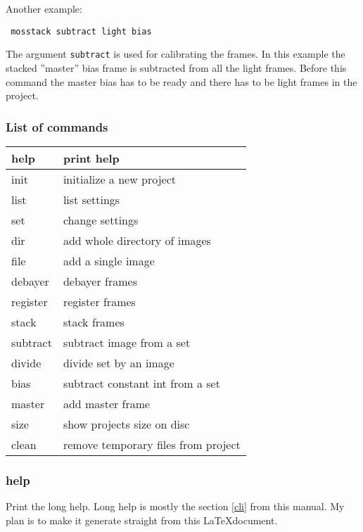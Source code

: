 \documentclass[twoside,a4paper]{refart}
\begin{document}
Another example:

\begin{verbatim}
 mosstack subtract light bias
\end{verbatim}

The argument \texttt{subtract} is used for calibrating the frames. In this example the stacked ''master'' bias frame is
subtracted from all the light frames. Before this command the master bias has to be ready and there has to be light frames
in the project.


\subsubsection{List of commands}
\label{list of commands}

\begin{tabular}{|l|l|}
\hline
help        & print help \\ \hline
init        & initialize a new project \\ \hline
list        & list settings \\ \hline
set         & change settings \\ \hline
dir         & add whole directory of images\\ \hline
file        & add a single image\\ \hline
debayer     & debayer frames\\ \hline
register    & register frames\\ \hline
stack       & stack frames\\ \hline
subtract    & subtract image from a set\\ \hline
divide      & divide set by an image\\ \hline
bias        & subtract constant int from a set \\ \hline
master      & add master frame \\ \hline
size        & show projects size on disc \\ \hline
clean       & remove temporary files from project \\ \hline

\end{tabular}

\subsubsection{help}
\label{help}

Print the long help. Long help is mostly the section \ref{cli} from this manual. My plan is to make it generate
straight from this \LaTeX document.
\end{document}
